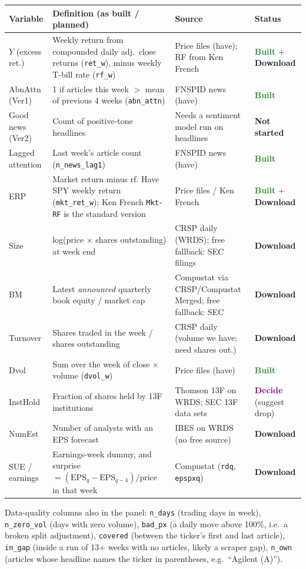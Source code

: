 \documentclass[11pt]{article}
\newcommand{\done}{\textcolor{ForestGreen}{\textbf{Built}}}
\newcommand{\dl}{\textcolor{BurntOrange}{\textbf{Download}}}
\newcommand{\todo}{\textcolor{BrickRed}{\textbf{Not started}}}
\newcommand{\decide}{\textcolor{Purple}{\textbf{Decide}}}
\newcommand{\var}[1]{\texttt{#1}}
\begin{document}
\begin{longtable}{>{\raggedright}p{2.3cm} >{\raggedright}p{5.4cm} >{\raggedright}p{4.6cm} p{1.9cm}}
\toprule
\textbf{Variable} & \textbf{Definition (as built / planned)} & \textbf{Source} & \textbf{Status}\\
\midrule\endhead
$Y$ (excess ret.) & Weekly return from compounded daily adj.\ close returns (\var{ret\_w}), minus weekly T-bill rate (\var{rf\_w}) & Price files (have); RF from Ken French & \done{} + \dl{} \\
AbnAttn (Ver1) & 1 if articles this week $>$ mean of previous 4 weeks (\var{abn\_attn}) & FNSPID news (have) & \done{} \\
Good news (Ver2) & Count of positive-tone headlines & Needs a sentiment model run on headlines & \todo{} \\
Lagged attention & Last week's article count (\var{n\_news\_lag1}) & FNSPID news (have) & \done{} \\
ERP & Market return minus rf. Have SPY weekly return (\var{mkt\_ret\_w}); Ken French \var{Mkt-RF} is the standard version & Price files / Ken French & \done{} + \dl{} \\
Size & log(price $\times$ shares outstanding) at week end & CRSP daily (WRDS); free fallback: SEC filings & \dl{} \\
BM & Latest \emph{announced} quarterly book equity / market cap & Compustat via CRSP/Compustat Merged; free fallback: SEC & \dl{} \\
Turnover & Shares traded in the week / shares outstanding & CRSP daily (volume we have; need shares out.) & \dl{} \\
Dvol & Sum over the week of close $\times$ volume (\var{dvol\_w}) & Price files (have) & \done{} \\
InstHold & Fraction of shares held by 13F institutions & Thomson 13F on WRDS; SEC 13F data sets & \decide{} (suggest drop) \\
NumEst & Number of analysts with an EPS forecast & IBES on WRDS (no free source) & \dl{} \\
SUE / earnings & Earnings-week dummy, and surprise $=(\text{EPS}_q-\text{EPS}_{q-4})/\text{price}$ in that week & Compustat (\var{rdq}, \var{epspxq}) & \dl{} \\
\bottomrule
\end{longtable}

Data-quality columns also in the panel: \var{n\_days} (trading days in week), \var{n\_zero\_vol} (days with zero volume), \var{bad\_px} (a daily move above 100\%, i.e.\ a broken split adjustment), \var{covered} (between the ticker's first and last article), \var{in\_gap} (inside a run of 13+ weeks with no articles, likely a scraper gap), \var{n\_own} (articles whose headline names the ticker in parentheses, e.g.\ ``Agilent (A)'').
\end{document}
